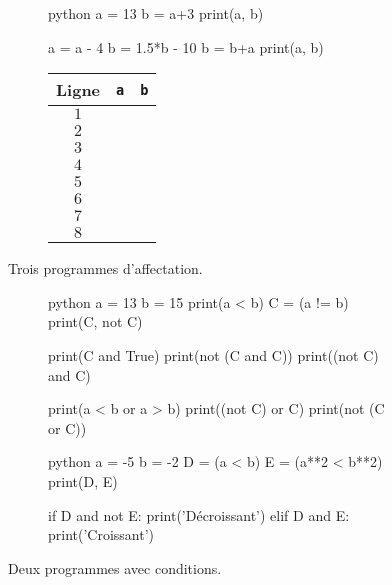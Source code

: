 \begin{figure}[h]
\begin{subfigure}{.5\textwidth}
\vspace{15pt}
\begin{mintedbox}{python}
a = 13
b = a+3
print(a, b)

a = a - 4
b = 1.5*b - 10
b = b+a
print(a, b)
\end{mintedbox}
\end{subfigure}
\hfill
\begin{subfigure}{.45\textwidth}
	\begin{tabular}{|c|c|c|}\hline
		Ligne & \texttt{a} & \texttt{b} \\ \hline
		$1$ && \\ \hline
		$2$ && \\ \hline
		$3$ && \\ \hline
		$4$ && \\ \hline
		$5$ && \\ \hline
		$6$ && \\ \hline
		$7$ && \\ \hline
		$8$ && \\ \hline
	\end{tabular}
\end{subfigure}

\caption{Trois programmes d'affectation.}
\label{fig:1}
\end{figure}


\begin{figure}[h]
\begin{subfigure}{.5\textwidth}
\vspace{15pt}
\begin{mintedbox}{python}
a = 13
b = 15
print(a < b)
C = (a != b)
print(C, not C)

print(C and True)
print(not (C and C))
print((not C) and C)

print(a < b or a > b)
print((not C) or C)
print(not (C or C))
\end{mintedbox}
\end{subfigure}
\hfill
\begin{subfigure}{.45\textwidth}
\begin{mintedbox}{python}
a = -5
b = -2
D = (a < b)
E = (a**2 < b**2)
print(D, E)

if D and not E:
	print('Décroissant')
elif D and E:
	print('Croissant')
\end{mintedbox}
\end{subfigure}

\caption{Deux programmes avec conditions.}
\label{fig:3}
\end{figure}

